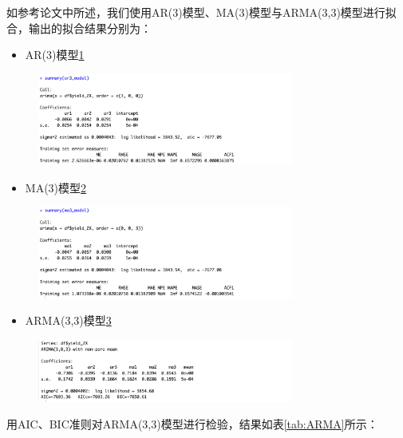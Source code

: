 \documentclass[12pt]{article}
\begin{document}
如参考论文中所述，我们使用AR(3)模型、MA(3)模型与ARMA(3,3)模型进行拟合，输出的拟合结果分别为：

\begin{itemize}
    \item AR(3)模型\ref{fig:A5}
\end{itemize}

\begin{figure}[H]
\centering
\includegraphics[width=0.75\textwidth]{A5.png}
\caption{}
\label{fig:A5}
\end{figure}

\begin{itemize}
    \item MA(3)模型\ref{fig:A6}
\end{itemize}

\begin{figure}[H]
\centering
\includegraphics[width=0.75\textwidth]{A6.png}
\caption{}
\label{fig:A6}
\end{figure}

\begin{itemize}
    \item ARMA(3,3)模型\ref{fig:A7}
\end{itemize}

\begin{figure}[H]
\centering
\includegraphics[width=0.75\textwidth]{A7.png}
\caption{}
\label{fig:A7}
\end{figure}

用AIC、BIC准则对ARMA(3,3)模型进行检验，结果如表\ref{tab:ARMA}所示：
\end{document}
